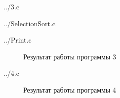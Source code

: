 \documentclass[a4paper,oneside,14pt]{extreport}
\begin{document}
\newpage
\begin{lstinputlisting}[
	caption={Программа 3},
	label={list3},
	style={c},
	]{../3.c}
\end{lstinputlisting}

\newpage
\begin{lstinputlisting}[
	caption={Программа sort для потомка},
	label={SelectionSortList},
	style={c},
	]{../SelectionSort.c}
\end{lstinputlisting}

\begin{lstinputlisting}[
	caption={Программа print для потомка},
	label={PrintList},
	style={c},
	]{../Print.c}
\end{lstinputlisting}

\begin{figure}[h]
	\caption{Результат работы программы 3}
	\label{3.1png}
\end{figure}

\newpage
\begin{lstinputlisting}[
	caption={Программа 4},
	label={list4},
	style={c},
	]{../4.c}
\end{lstinputlisting}

\newpage
\begin{figure}[h]
	\caption{Результат работы программы 4}
	\label{4.1png}
\end{figure}
\end{document}

